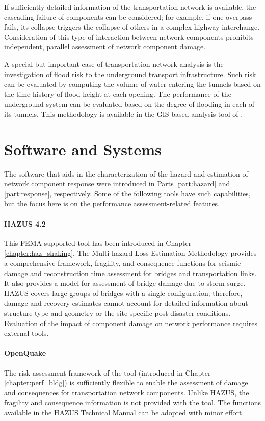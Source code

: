 If sufficiently detailed information of the transportation network is available, the cascading failure of components can be considered; for example, if one overpass fails, its collapse triggers the collapse of others in a complex highway interchange. Consideration of this type of interaction between network components prohibits independent, parallel assessment of network component damage.

A special but important case of transportation network analysis is the investigation of flood risk to the underground transport infrastructure. Such risk can be evaluated by computing the volume of water entering the tunnels based on the time history of flood height at each opening. The performance of the underground system can be evaluated based on the degree of flooding in each of its tunnels. This methodology is available in the GIS-based analysis tool of \citet{jacob2011responding}.

\section{Software and Systems}
\label{sec:perf_transport_tools}

The software that aids in the characterization of the hazard and estimation of network component response were introduced in Parts \ref{part:hazard} and \ref{part:response}, respectively. Some of the following tools have such capabilities, but the focus here is on the performance assessment-related features.

\paragraph{HAZUS 4.2} This FEMA-supported tool has been introduced in Chapter \ref{chapter:haz_shaking}. The  Multi-hazard Loss Estimation Methodology provides a comprehensive framework, fragility, and consequence functions for seismic damage and reconstruction time assessment for bridges and transportation links. It also provides a model for assessment of bridge damage due to storm surge. HAZUS covers large groups of bridges with a single configuration; therefore, damage and recovery estimates cannot account for detailed information about structure type and geometry or the site-specific post-disaster conditions. Evaluation of the impact of component damage on network performance requires external tools.

\paragraph{OpenQuake} The risk assessment framework of the  tool (introduced in Chapter \ref{chapter:perf_bldg}) is sufficiently flexible to enable the assessment of damage and consequences for transportation network components. Unlike HAZUS, the fragility and consequence information is not provided with the tool. The functions available in the HAZUS Technical Manual \citep{fema2020earthquaketechnical} can be adopted with minor effort.

